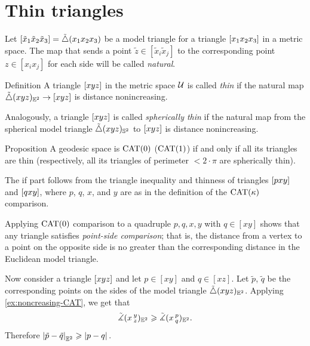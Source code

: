 \section{Thin triangles}

Let $\trig{\tilde x_1}{\tilde x_2}{\tilde x_3}\z=\modtrig({x_1}{x_2}{x_3})$
be a model triangle for a triangle 
$[x_1x_2x_3]$ in a metric space.
The map that sends a point $\tilde z\in[\tilde x_i\tilde x_j]$ to the corresponding point $z\in[x_ix_j]$ for each side will be called \emph{natural}.

\begin{thm}{Definition}\label{def:k-thin}
A triangle $[xyz]$ in the metric space $\mathcal{U}$ 
is called \emph{thin} if the natural map $\tilde\triangle{}({x}{y}{z})_{\mathbb{E}^2}\to [xyz]$ is distance nonincreasing.

Analogously, a triangle $[xyz]$ 
is called \emph{spherically thin} if
the natural map from the spherical model triangle $\tilde\triangle{}({x}{y}{z})_{\mathbb{S}^2}$ to $[xyz]$ is distance nonincreasing.

\end{thm}

\begin{thm}{Proposition}\label{prop:thin=cat}
A geodesic space is $\mathrm{CAT}(0)$ 
($\mathrm{CAT}(1)$) 
if and only if 
all its triangles are thin (respectively, all its triangles of perimeter $<2\cdot\pi$ are spherically thin).
\end{thm}

 The if part follows from the triangle inequality and thinness of triangles $[pxy]$ and $[qxy]$, where $p$, $q$, $x$, and $y$ are as in the definition of the $\mathrm{CAT}(\kappa)$ comparison.

Applying $\mathrm{CAT}(0)$ comparison to a quadruple $p,q,x,y$ with $q\in [xy]$ shows that any triangle satisfies \emph{point-side comparison}; that is, the distance from a vertex to a  point on the opposite side is no greater than the corresponding distance in the Euclidean model triangle.

Now consider a triangle $[xyz]$ and let $p\in [xy]$ and $q\in [xz]$.
Let $\tilde p$, $\tilde q$ be the corresponding points on the sides of the model triangle $\tilde\triangle({x}{y}{z})_{\mathbb{E}^2}$.
Applying \ref{ex:noncreasing-CAT}, we get that
\[\tilde\measuredangle(x\,{}^{y}_{z})_{\mathbb{E}^2} \geqslant \tilde\measuredangle(x\,{}^{p}_{q}) _{\mathbb{E}^2}.\]
Therefore $ \dist{\tilde p}{\tilde q}{\EE^2}\ge \dist{p}{q}{}$.

